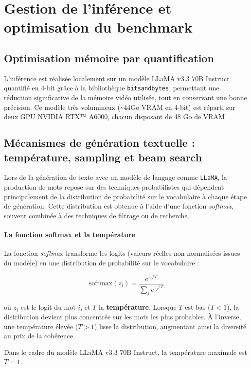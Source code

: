 \documentclass[a4paper,11pt]{article}
\begin{document}
\section{Gestion de l’inférence et optimisation du benchmark}

\subsection{Optimisation mémoire par quantification}

L’inférence est réalisée localement sur un modèle LLaMA v3.3 70B Instruct quantifié en 4-bit grâce à la bibliothèque \texttt{bitsandbytes}, permettant une réduction significative de la mémoire vidéo utilisée, tout en conservant une bonne précision. Ce modèle très volumineux (\verb|~|44Go VRAM en 4-bit) est réparti sur deux GPU NVIDIA RTX™ A6000, chacun disposant de 48 Go de VRAM

\subsection{Mécanismes de génération textuelle : température, sampling et beam search}

Lors de la génération de texte avec un modèle de langage comme \texttt{LLaMA}, la production de mots repose sur des techniques probabilistes qui dépendent principalement de la distribution de probabilité sur le vocabulaire à chaque étape de génération. Cette distribution est obtenue à l’aide d’une fonction \textit{softmax}, souvent combinée à des techniques de filtrage ou de recherche.

\paragraph{La fonction softmax et la température}

La fonction \textit{softmax} transforme les logits (valeurs réelles non normalisées issues du modèle) en une distribution de probabilité sur le vocabulaire :

\[
\text{softmax}(z_i) = \frac{e^{z_i / T}}{\sum_{j} e^{z_j / T}}
\]

où $z_i$ est le logit du mot $i$, et $T$ la \textbf{température}. Lorsque $T$ est bas ($T < 1$), la distribution devient plus concentrée sur les mots les plus probables. À l’inverse, une température élevée ($T > 1$) lisse la distribution, augmentant ainsi la diversité au prix de la cohérence. 

Dans le cadre du modèle LLaMA v3.3 70B Instruct, la température maximale est $T=1$.
\end{document}
